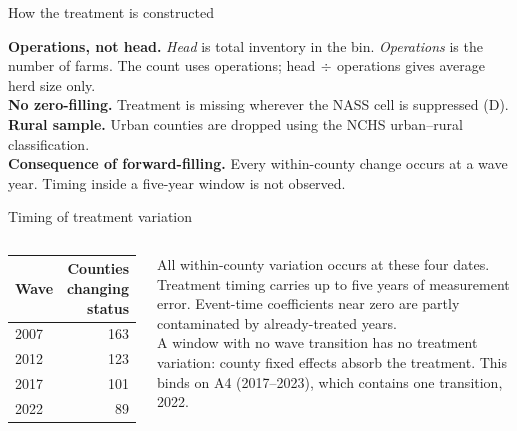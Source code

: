 \documentclass[aspectratio=169]{beamer}
\begin{document}
\begin{frame}{How the treatment is constructed}
\begin{center}
\end{center}
\vspace{0.4em}
{\footnotesize
\textbf{Operations, not head.} \emph{Head} is total inventory in the bin. \emph{Operations} is the number of farms. The count uses operations; head$\,\div\,$operations gives average herd size only.\\[0.3em]
\textbf{No zero-filling.} Treatment is missing wherever the NASS cell is suppressed (D).\\[0.3em]
\textbf{Rural sample.} Urban counties are dropped using the NCHS urban--rural classification.\\[0.3em]
\textbf{Consequence of forward-filling.} Every within-county change occurs at a wave year. Timing inside a five-year window is not observed.}
\end{frame}

\begin{frame}{Timing of treatment variation}
\begin{columns}[T,onlytextwidth]
\begin{center}\footnotesize
\begin{tabular}{lr}
\toprule
Wave & Counties changing status \\
\midrule
2007 & 163 \\
2012 & 123 \\
2017 & 101 \\
2022 & \phantom{0}89 \\
\bottomrule
\end{tabular}
\end{center}
{\footnotesize
All within-county variation occurs at these four dates.\\[0.4em]
Treatment timing carries up to five years of measurement error. Event-time coefficients near zero are partly contaminated by already-treated years.\\[0.4em]
A window with no wave transition has no treatment variation: county fixed effects absorb the treatment. This binds on A4 (2017--2023), which contains one transition, 2022.}
\end{columns}
\end{frame}
\end{document}
